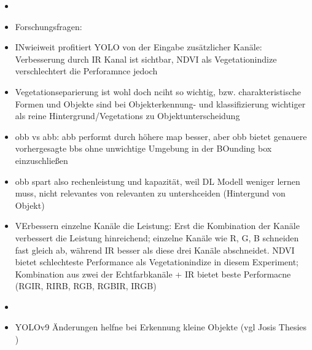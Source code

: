 \begin{itemize}
    \item \item Forschungsfragen:
        \item INwieiweit profitiert YOLO von der Eingabe zusätzlicher Kanäle: Verbesserung durch IR Kanal ist sichtbar, NDVI als Vegetationindize verschlechtert die Perforamnce jedoch
        \item Vegetationseparierung ist wohl doch nciht so wichtig, bzw. charakteristische Formen und Objekte sind bei Objekterkennung- und klassifizierung wichtiger als reine Hintergrund/Vegetations zu Objektunterscheidung
        \item obb vs abb: abb performt durch höhere map besser, aber obb bietet genauere vorhergesagte bbs ohne unwichtige Umgebung in der BOunding box einzuschließen
        \item obb spart also rechenleistung und kapazität, weil DL Modell weniger lernen muss, nicht relevantes von relevanten zu untershceiden (Hintergund von Objekt)
        \item VErbessern einzelne Kanäle die Leistung: Erst die Kombination der Kanäle verbessert die Leistung hinreichend; einzelne Kanäle wie R, G, B schneiden fast gleich ab, während IR besser als diese drei Kanäle abschneidet. NDVI bietet schlechteste Performance als Vegetationindize in diesem Experiment; Kombination aus zwei der Echtfarbkanäle + IR bietet beste Performacne (RGIR, RIRB, RGB, RGBIR, IRGB)
        \item 
\end{itemize}
\begin{itemize}
    \item YOLOv9 Änderungen helfne bei Erkennung kleine Objekte (vgl Josis Thesies )
\end{itemize}






